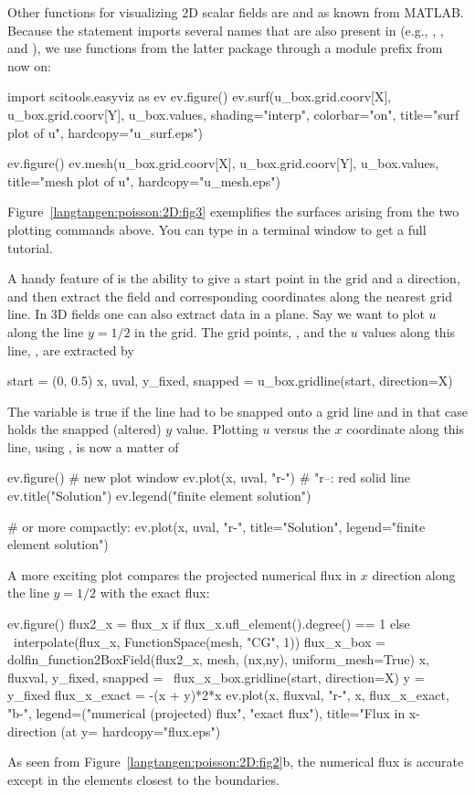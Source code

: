 Other functions for visualizing 2D scalar fields are  and
 as known from MATLAB. Because the  statement imports several names that are also present in
 (e.g., , , and
), we use functions from the latter package through a
module prefix  from now on:
\begin{python}
import scitools.easyviz as ev
ev.figure()
ev.surf(u_box.grid.coorv[X], u_box.grid.coorv[Y], u_box.values,
        shading="interp", colorbar="on",
        title="surf plot of u", hardcopy="u_surf.eps")

ev.figure()
ev.mesh(u_box.grid.coorv[X], u_box.grid.coorv[Y], u_box.values,
        title="mesh plot of u", hardcopy="u_mesh.eps")
\end{python}
Figure~\ref{langtangen:poisson:2D:fig3} exemplifies the surfaces
arising from the two plotting commands above.  You can type
 in a terminal
window to get a full tutorial.

A handy feature of  is the
ability to give a start point in the grid and a direction, and then
extract the field and corresponding coordinates along the nearest grid
line. In 3D fields one can also extract data in a plane.  Say we want
to plot $u$ along the line $y=1/2$ in the grid. The grid points,
, and the $u$ values along this line,
, are extracted by
\begin{python}
start = (0, 0.5)
x, uval, y_fixed, snapped = u_box.gridline(start, direction=X)
\end{python}
The variable  is true if the line had to be snapped onto a
grid line and in that case  holds the snapped
(altered) $y$ value.
Plotting $u$ versus the $x$ coordinate along this line, using
, is now a matter of
\begin{python}
ev.figure()  # new plot window
ev.plot(x, uval, "r-")  # "r--: red solid line
ev.title("Solution")
ev.legend("finite element solution")

# or more compactly:
ev.plot(x, uval, "r-", title="Solution",
        legend="finite element solution")
\end{python}

A more exciting plot compares the projected numerical flux in
$x$ direction along the
line $y=1/2$ with the exact flux:
\begin{python}
ev.figure()
flux2_x = flux_x if flux_x.ufl_element().degree() == 1 else \
    interpolate(flux_x, FunctionSpace(mesh, "CG", 1))
flux_x_box = dolfin_function2BoxField(flux2_x, mesh, (nx,ny),
                                      uniform_mesh=True)
x, fluxval, y_fixed, snapped = \
      flux_x_box.gridline(start, direction=X)
y = y_fixed
flux_x_exact = -(x + y)*2*x
ev.plot(x, fluxval, "r-",
        x, flux_x_exact, "b-",
        legend=("numerical (projected) flux", "exact flux"),
        title="Flux in x-direction (at y=%
        hardcopy="flux.eps")
\end{python}
As seen from Figure~\ref{langtangen:poisson:2D:fig2}b, the numerical flux
is accurate except in the elements closest to the boundaries.

